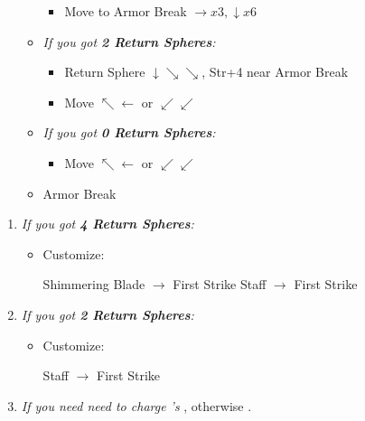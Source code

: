 \begin{spheregrid}
\begin{multicols}{2}
\begin{itemize}
\begin{itemize}
                        \begin{itemize}
                            \item Move to Armor Break $\rightarrow x3, \downarrow x6$
                        \end{itemize}
                    \item \textit{If you got \textbf{2 Return Spheres}:}
                        \begin{itemize}
                            \item Return Sphere $\downarrow\searrow\searrow$, Str+4 near Armor Break
                            \item Move $\nwarrow\leftarrow$ or $\swarrow\swarrow$
                        \end{itemize}
                    \item \textit{If you got \textbf{0 Return Spheres}:}
                        \begin{itemize}
                            \item Move $\nwarrow\leftarrow$ or $\swarrow\swarrow$
                        \end{itemize}
                    \item Armor Break
                \end{itemize}
        \end{itemize}
    \end{multicols}
\end{spheregrid}
\bothnp
\colstart
\begin{enumerate}[resume]
    \item \textit{If you got \textbf{4 Return Spheres}:}
        \begin{itemize}
            \item Customize:
                \begin{itemize}
                    \auronf Shimmering Blade $\rightarrow$ First Strike
                    \yunaf Staff $\rightarrow$ First Strike
                \end{itemize}
        \end{itemize}
    \item \textit{If you got \textbf{2 Return Spheres}:}
        \begin{itemize}
            \item Customize:
            \begin{itemize}
                \yunaf Staff $\rightarrow$ First Strike
            \end{itemize}
        \end{itemize}
    \bothvfill
    \winvfill
    \lossvfill
    \item \textit{If you need need to charge \rikku's \od} \formation{\tidus}{\rikku}{\auron}, otherwise \formation{\tidus}{\kimahri}{\wakka}.
\end{enumerate}
